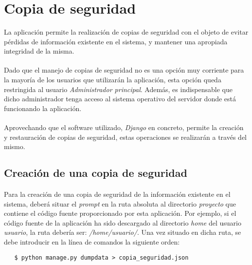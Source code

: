 \section{Copia de seguridad}

  \paragraph{}La aplicación permite la realización de copias de seguridad con
  el objeto de evitar pérdidas de información existente en el sistema, y
  mantener una apropiada integridad de la misma.

  \paragraph{}Dado que el manejo de copias de seguridad no es una opción muy
  corriente para la mayoría de los usuarios que utilizarán la aplicación, esta
  opción queda restringida al usuario \textit{Administrador principal}. Además,
  es indispensable que dicho administrador tenga acceso al sistema operativo
  del servidor donde está funcionando la aplicación.

  \paragraph{}Aprovechando que el software utilizado,
  \textit{Django}\cite{django} en concreto, permite la creación y restauración
  de copias de seguridad, estas operaciones se realizarán a través del mismo.

\subsection{Creación de una copia de seguridad}

  \paragraph{}Para la creación de una copia de seguridad de la información
  existente en el sistema, deberá situar el \textit{prompt} en la ruta absoluta
  al directorio \textit{proyecto} que contiene el código fuente proporcionado
  por esta aplicación. Por ejemplo, si el código fuente de la aplicación ha sido
  descargado al directorio \textit{home} del usuario \textit{usuario}, la ruta
  debería ser: \textit{/home/usuario/}. Una vez situado en dicha ruta, se debe
  introducir en la línea de comandos la siguiente orden:

   \begin{verbatim}
   $ python manage.py dumpdata > copia_seguridad.json
   \end{verbatim}

